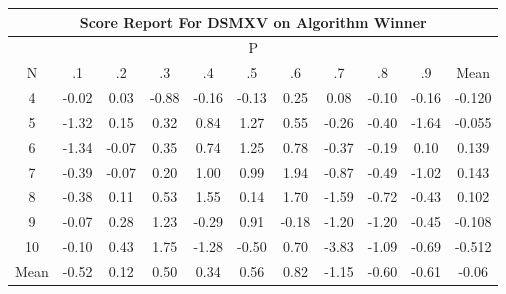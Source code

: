 \documentclass[11pt,a4paper]{report}
\begin{document}
\begin{longtable}{ | c || c | c | c | c | c | c | c | c | c || c |}
\hline
\multicolumn{11}{|c|}{ Score Report For DSMXV on Algorithm Winner} \\
\hline
\multicolumn{11}{|c|}{ P } \\
\hline
N & .1 & .2 & .3 & .4 & .5 & .6 & .7 & .8 & .9 & Mean\\
 \hline
 \hline
 \endhead
  4 &  \cellcolor[HTML]{FFFFFF} -0.02 &  \cellcolor[HTML]{FFFFFF} 0.03 &  \cellcolor[HTML]{FFE7E7} -0.88 &  \cellcolor[HTML]{FFFFFF} -0.16 &  \cellcolor[HTML]{FFFFFF} -0.13 &  \cellcolor[HTML]{F7F7FF} 0.25 &  \cellcolor[HTML]{FFFFFF} 0.08 &  \cellcolor[HTML]{FFFFFF} -0.10 &  \cellcolor[HTML]{FFF7F7} -0.16 & -0.120 \\
  5 &  \cellcolor[HTML]{FFDFDF} -1.32 &  \cellcolor[HTML]{FFFFFF} 0.15 &  \cellcolor[HTML]{F7F7FF} 0.32 &  \cellcolor[HTML]{E7E7FF} 0.84 &  \cellcolor[HTML]{DFDFFF} 1.27 &  \cellcolor[HTML]{EFEFFF} 0.55 &  \cellcolor[HTML]{FFF7F7} -0.26 &  \cellcolor[HTML]{FFF7F7} -0.40 &  \cellcolor[HTML]{FFD7D7} -1.64 & -0.055 \\
  6 &  \cellcolor[HTML]{FFDFDF} -1.34 &  \cellcolor[HTML]{FFFFFF} -0.07 &  \cellcolor[HTML]{F7F7FF} 0.35 &  \cellcolor[HTML]{EFEFFF} 0.74 &  \cellcolor[HTML]{DFDFFF} 1.25 &  \cellcolor[HTML]{EFEFFF} 0.78 &  \cellcolor[HTML]{FFF7F7} -0.37 &  \cellcolor[HTML]{FFF7F7} -0.19 &  \cellcolor[HTML]{FFFFFF} 0.10 & 0.139 \\
  7 &  \cellcolor[HTML]{FFF7F7} -0.39 &  \cellcolor[HTML]{FFFFFF} -0.07 &  \cellcolor[HTML]{F7F7FF} 0.20 &  \cellcolor[HTML]{E7E7FF} 1.00 &  \cellcolor[HTML]{E7E7FF} 0.99 &  \cellcolor[HTML]{CFCFFF} 1.94 &  \cellcolor[HTML]{FFE7E7} -0.87 &  \cellcolor[HTML]{FFEFEF} -0.49 &  \cellcolor[HTML]{FFE7E7} -1.02 & 0.143 \\
  8 &  \cellcolor[HTML]{FFF7F7} -0.38 &  \cellcolor[HTML]{FFFFFF} 0.11 &  \cellcolor[HTML]{EFEFFF} 0.53 &  \cellcolor[HTML]{D7D7FF} 1.55 &  \cellcolor[HTML]{FFFFFF} 0.14 &  \cellcolor[HTML]{D7D7FF} 1.70 &  \cellcolor[HTML]{FFD7D7} -1.59 &  \cellcolor[HTML]{FFEFEF} -0.72 &  \cellcolor[HTML]{FFF7F7} -0.43 & 0.102 \\
  9 &  \cellcolor[HTML]{FFFFFF} -0.07 &  \cellcolor[HTML]{F7F7FF} 0.28 &  \cellcolor[HTML]{DFDFFF} 1.23 &  \cellcolor[HTML]{FFF7F7} -0.29 &  \cellcolor[HTML]{E7E7FF} 0.91 &  \cellcolor[HTML]{FFF7F7} -0.18 &  \cellcolor[HTML]{FFDFDF} -1.20 &  \cellcolor[HTML]{FFDFDF} -1.20 &  \cellcolor[HTML]{FFF7F7} -0.45 & -0.108 \\
  10 &  \cellcolor[HTML]{FFFFFF} -0.10 &  \cellcolor[HTML]{F7F7FF} 0.43 &  \cellcolor[HTML]{CFCFFF} 1.75 &  \cellcolor[HTML]{FFDFDF} -1.28 &  \cellcolor[HTML]{FFEFEF} -0.50 &  \cellcolor[HTML]{EFEFFF} 0.70 &  \cellcolor[HTML]{FF9F9F} -3.83 &  \cellcolor[HTML]{FFE7E7} -1.09 &  \cellcolor[HTML]{FFEFEF} -0.69 & -0.512 \\
 \hline
 \hline
Mean &  \cellcolor[HTML]{FFEFEF} -0.52 &  \cellcolor[HTML]{FFFFFF} 0.12 &  \cellcolor[HTML]{EFEFFF} 0.50 &  \cellcolor[HTML]{F7F7FF} 0.34 &  \cellcolor[HTML]{EFEFFF} 0.56 &  \cellcolor[HTML]{E7E7FF} 0.82 &  \cellcolor[HTML]{FFDFDF} -1.15 &  \cellcolor[HTML]{FFEFEF} -0.60 &  \cellcolor[HTML]{FFEFEF} -0.61 &  \cellcolor[HTML]{FFFFFF} -0.06
\end{longtable}
\end{document}
